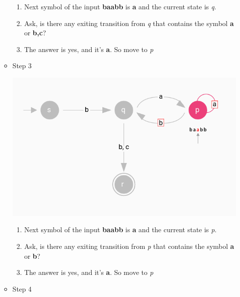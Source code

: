 \documentclass[12pt]{article}
\begin{document}
\begin{itemize}
\begin{itemize}
        \begin{enumerate}[1.]
            \item Next symbol of the input \textbf{baabb} is \textbf{a} and the current state is \textit{q}.
            \item Ask, is there any exiting transition from \textit{q} that contains the symbol \textbf{a} or \textbf{b,c}?
            \item The answer is yes, and it's \textbf{a}. So move to \textit{p}
        \end{enumerate}

        \item Step 3

        \begin{center}
        \includegraphics[width=\linewidth]{images/worksheet_8_notes_11.png}
        \end{center}

        \begin{enumerate}[1.]
            \item Next symbol of the input \textbf{baabb} is \textbf{a} and the current state is \textit{p}.
            \item Ask, is there any exiting transition from \textit{p} that contains the symbol \textbf{a} or \textbf{b}?
            \item The answer is yes, and it's \textbf{a}. So move to \textit{p}
        \end{enumerate}

        \item Step 4


\end{itemize}
\end{itemize}
\end{document}
